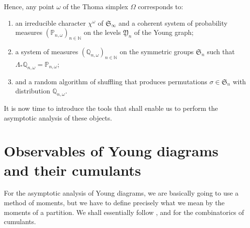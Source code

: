 \documentclass[smallextended,nospthms]{svjour3}
\theoremstyle{remark}
\newcommand{\N}{\mathbb{N}}
\newcommand{\sym}{\mathfrak{S}}
\newcommand{\ym}{\mathfrak{Y}}
\newcommand{\proba}{\mathbb{P}}
\newcommand{\qproba}{\mathbb{Q}}
\begin{document}
\noindent Hence, any point $\omega$ of the Thoma simplex $\Omega$ corresponds to:\vspace{2mm}
\begin{enumerate}
\item an irreducible character $\chi^{\omega}$ of $\sym_{\infty}$ and a coherent system of probability measures $(\proba_{n,\omega})_{n \in \N}$ on the levels $\ym_{n}$ of the Young graph;\vspace{2mm}
\item a system of measures $(\qproba_{n,\omega})_{n\in \N}$ on the symmetric groups $\sym_{n}$ such that $\Lambda_{*}\qproba_{n,\omega}=\proba_{n,\omega}$;\vspace{2mm}
\item and a random algorithm of shuffling that produces permutations $\sigma \in \sym_{n}$ with distribution $\qproba_{n,\omega}$.\vspace{2mm}
\end{enumerate}
It is now time to introduce the tools that shall enable us to perform the asymptotic analysis of these objects.
\bigskip



       	

\section{Observables of Young diagrams and their cumulants}\label{obs}
For the asymptotic analysis of Young diagrams, we are basically going to use a method of moments, but we have to define precisely what we mean by the moments of a partition. We shall essentially follow \cite{IO02}, and \cite{Sni06b,FM10} for the combinatorics of cumulants.
\end{document}
